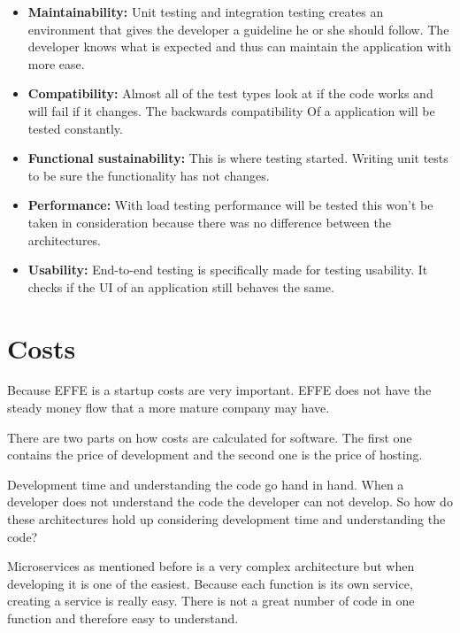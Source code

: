 \begin{itemize}
        \item \textbf{Maintainability:} Unit testing and integration testing creates an environment that gives the developer a guideline he or she should follow. The developer knows what is expected and thus can maintain the application with more ease.

        \item \textbf{Compatibility:} Almost all of the test types look at if the code works and will fail if it changes. The backwards compatibility Of a application will be tested constantly.

        \item \textbf{Functional sustainability:} This is where testing started. Writing unit tests to be sure the functionality has not changes.

        \item \textbf{Performance:} With load testing performance will be tested this won’t be taken in consideration because there was no difference between the architectures.

        \item \textbf{Usability:} End-to-end testing is specifically made for testing usability. It checks if the UI of an application still behaves the same.
\end{itemize}

\section{Costs}
\label{sec:Costs}

Because EFFE is a startup costs are very important. EFFE does not have the steady money flow that a more mature company may have.

There are two parts on how costs are calculated for software. The first one contains the price of development and the second one is the price of hosting.

Development time and understanding the code go hand in hand. When a developer does not understand the code the developer can not develop. So how do these architectures hold up considering development time and understanding the code?

Microservices as mentioned before is a very complex architecture but when developing it is one of the easiest. Because each function is its own service, creating a service is really easy. There is not a great number of code in one function and therefore easy to understand.

